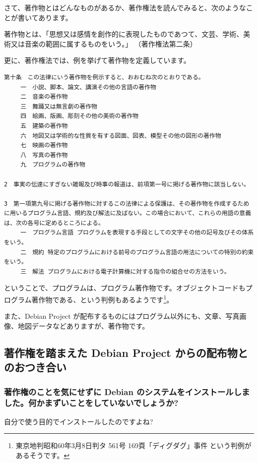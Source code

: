 \documentclass[mingoth,a4paper]{jsarticle}
\begin{document}
さて、著作物とはどんなものがあるか、著作権法を読んでみると、次のようなことが書いてあります。

著作物とは、「思想又は感情を創作的に表現したものであつて、文芸、学術、美術又は音楽の範囲に属するものをいう。」
（著作権法第二条）


更に、著作権法では、例を挙げて著作物を定義しています。

\begin{verbatim}
第十条　この法律にいう著作物を例示すると、おおむね次のとおりである。
　 	一　小説、脚本、論文、講演その他の言語の著作物
　 	二　音楽の著作物
　 	三　舞踊又は無言劇の著作物
　 	四　絵画、版画、彫刻その他の美術の著作物
　 	五　建築の著作物
　 	六　地図又は学術的な性質を有する図面、図表、模型その他の図形の著作物
　 	七　映画の著作物
　 	八　写真の著作物
　 	九　プログラムの著作物

2　事実の伝達にすぎない雑報及び時事の報道は、前項第一号に掲げる著作物に該当しない。

3　第一項第九号に掲げる著作物に対するこの法律による保護は、その著作物を作成するために用いるプログラム言語、規約及び解法に及ばない。この場合において、これらの用語の意義は、次の各号に定めるところによる。
　 	一　プログラム言語 プログラムを表現する手段としての文字その他の記号及びその体系をいう。
　 	二　規約 特定のプログラムにおける前号のプログラム言語の用法についての特別の約束をいう。
　 	三　解法 プログラムにおける電子計算機に対する指令の組合せの方法をいう。
\end{verbatim}

ということで、プログラムは、プログラム著作物です。オブジェクトコードもプログラム著作物である、という判例もあるようです\footnote{東京地判昭和60年3月8日判タ 561号 169頁「ディグダグ」事件 という判例があるそうです\cite{saito}。}。

また、Debian Project が配布するものにはプログラム以外にも、文章、写真画像、地図データなどありますが、著作物です。


\subsection{著作権を踏まえた Debian Project からの配布物とのおつき合い}


\subsubsection{著作権のことを気にせずに Debian のシステムをインストールしました。何かまずいことをしていないでしょうか?}

自分で使う目的でインストールしたのですよね?
\end{document}
